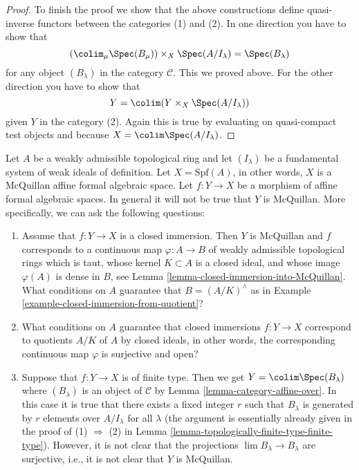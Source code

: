 \begin{proof}
\medskip\noindent
To finish the proof we show that the above constructions
define quasi-inverse functors between the categories (1) and (2).
In one direction you have to show that
$$
\left(\colim_\mu \Spec(B_\mu)\right) \times_X \Spec(A/I_\lambda) =
\Spec(B_\lambda)
$$
for any object $(B_\lambda)$ in the category $\mathcal{C}$.
This we proved above. For
the other direction you have to show that
$$
Y = \colim (Y \times_X \Spec(A/I_\lambda))
$$
given $Y$ in the category (2). Again this is true by evaluating on
quasi-compact test objects and because $X = \colim \Spec(A/I_\lambda)$.
\end{proof}

\begin{remark}
\label{remark-questions}
Let $A$ be a weakly admissible topological ring and let $(I_\lambda)$
be a fundamental system of weak ideals of definition. Let $X = \text{Spf}(A)$,
in other words, $X$ is a McQuillan affine formal algebraic space.
Let $f : Y \to X$ be a morphism of affine formal algebraic spaces.
In general it will not be true that $Y$ is McQuillan. More specifically,
we can ask the following questions:
\begin{enumerate}
\item Assume that $f : Y \to X$ is a closed immersion. Then
$Y$ is McQuillan and $f$ corresponds to a continuous map
$\varphi : A \to B$ of weakly admissible topological rings
which is taut, whose kernel $K \subset A$ is a closed ideal, and
whose image $\varphi(A)$ is dense in $B$, see
Lemma \ref{lemma-closed-immersion-into-McQuillan}.
What conditions on $A$ guarantee that $B = (A/K)^\wedge$ as in
Example \ref{example-closed-immersion-from-quotient}?
\item What conditions on $A$ guarantee that closed immersions
$f : Y \to X$ correspond to quotients $A/K$ of $A$ by closed ideals,
in other words, the corresponding continuous map $\varphi$ is surjective
and open?
\item Suppose that $f : Y \to X$ is of finite type. Then we get
$Y = \colim \Spec(B_\lambda)$ where $(B_\lambda)$ is an object of
$\mathcal{C}$ by Lemma \ref{lemma-category-affine-over}.
In this case it is true that there exists a fixed integer $r$ such
that $B_\lambda$ is generated by $r$ elements over $A/I_\lambda$ for
all $\lambda$ (the argument is essentially already given in the proof of
(1) $\Rightarrow$ (2) in
Lemma \ref{lemma-topologically-finite-type-finite-type}).
However, it is not clear that the projections
$\lim B_\lambda \to B_\lambda$ are surjective, i.e.,
it is not clear that $Y$ is McQuillan.

\end{enumerate}
\end{remark}
